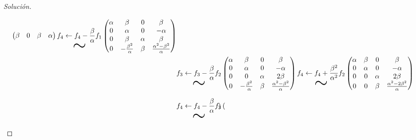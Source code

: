 \documentclass{article}
\begin{document}
\begin{proof}[Solución]
\begin{itemize}
\begin{align*}
\begin{pmatrix}
                    \beta  & 0      & \beta  & \alpha
                \end{pmatrix} \underset{\text{\Huge$\sim$}}{f_{4}\leftarrow f_{4}-\frac{\beta}{\alpha}f_{1}}
                \begin{pmatrix}
                    \alpha & \beta                     & 0      & \beta                               \\
                    0      & \alpha                    & 0      & -\alpha                             \\
                    0      & \beta                     & \alpha & \beta                               \\
                    0      & -\frac{\beta^{2}}{\alpha} & \beta  & \frac{\alpha^{2}-\beta^{2}}{\alpha}
                \end{pmatrix} \\
                 & \underset{\text{\Huge$\sim$}}{f_{3}\leftarrow f_{3}-\frac{\beta}{\alpha}f_{2}}
                \begin{pmatrix}
                    \alpha & \beta                     & 0      & \beta                               \\
                    0      & \alpha                    & 0      & -\alpha                             \\
                    0      & 0                         & \alpha & 2\beta                              \\
                    0      & -\frac{\beta^{2}}{\alpha} & \beta  & \frac{\alpha^{2}-\beta^{2}}{\alpha}
                \end{pmatrix}
                \underset{\text{\Huge$\sim$}}{f_{4}\leftarrow f_{4}+\frac{\beta^{2}}{\alpha^{2}}f_{2}}
                \begin{pmatrix}
                    \alpha & \beta  & 0      & \beta                                \\
                    0      & \alpha & 0      & -\alpha                              \\
                    0      & 0      & \alpha & 2\beta                               \\
                    0      & 0      & \beta  & \frac{\alpha^{2}-2\beta^{2}}{\alpha}
                \end{pmatrix}                             \\
                 & \underset{\text{\Huge$\sim$}}{f_{4}\leftarrow f_{4}-\frac{\beta}{\alpha}f_{3}}
                \begin{pmatrix}

\end{pmatrix}
\end{align*}
\end{itemize}
\end{proof}
\end{document}
